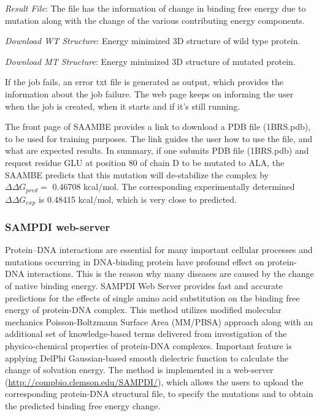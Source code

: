 \documentclass[9pt,tutorial,pubversion]{livecoms}
\begin{document}
\textit{ Result File}: The file has the information of change in binding free energy due to mutation along with the change of the various contributing energy components.

\textit{Download WT Structure}: Energy minimized 3D structure of wild type protein.

\textit{Download MT Structure}: Energy minimized 3D structure of mutated protein.

If the job fails, an error txt file is generated as output, which provides the information about the job failure. The web page keeps on informing the user when the job is created, when it starts and if it’s still running.

The front page of SAAMBE provides a link to download a PDB file (1BRS.pdb), to be used for training purposes. The link guides the user how to use the file, and what are expected results. In summary, if one submits PDB file (1BRS.pdb) and request residue GLU at position 80 of chain D to be mutated to ALA, the SAAMBE predicts that this mutation will de-stabilize the complex by $ \Delta\Delta G_{pred} =$ 0.46708 kcal/mol. The corresponding experimentally determined $ \Delta\Delta G_{exp} $ is  0.48415 kcal/mol, which is very close to predicted.

\subsubsection{SAMPDI web-server}
Protein–DNA interactions are essential for many important cellular processes and mutations occurring in DNA-binding protein have profound effect on protein-DNA interactions. This is the reason why many diseases are caused by the change of native binding energy. SAMPDI\cite{peng2017predicting} Web Server provides fast and accurate predictions for the effects of single amino acid substitution on the binding free energy of protein-DNA complex. This method utilizes modified molecular mechanics Poisson-Boltzmann Surface Area (MM/PBSA) approach along with an additional set of knowledge-based terms delivered from investigation of the physico-chemical properties of protein-DNA complexes. Important feature is applying DelPhi Gaussian-based smooth dielectric function to calculate the change of solvation energy. The method is implemented in a web-server (\url{http://compbio.clemson.edu/SAMPDI/}), which allows the users to upload the corresponding protein-DNA structural file, to specify the mutations and to obtain the predicted binding free energy change.
\end{document}
